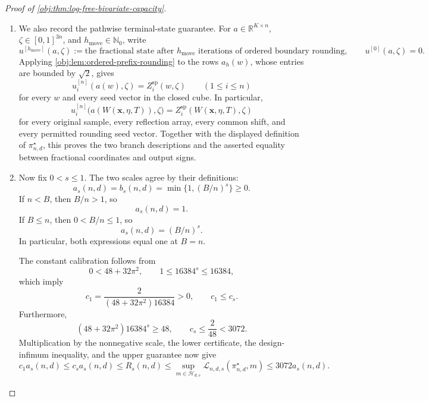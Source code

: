 \begin{proof}[Proof of \cref{obj:thm:log-free-bivariate-capacity}]
\begin{enumerate}
\item
We also record the pathwise terminal-state guarantee. For
\(a\in\mathbb R^{K\times n}\), \(\zeta\in[0,1]^{3n}\), and
\(h_{\mathrm{move}}\in\mathbb N_0\), write
\[
u^{[h_{\mathrm{move}}]}(a,\zeta)
:=
\text{the fractional state after }h_{\mathrm{move}}
\text{ iterations of ordered boundary rounding},
\qquad
u^{[0]}(a,\zeta)=0.
\]
Applying \cref{obj:lem:ordered-prefix-rounding} to the rows
\(a_h(w)\), whose entries are bounded by \(\sqrt2\), gives
\[
u_i^{[n]}(a(w),\zeta)=Z_i^{\mathrm{sp}}(w,\zeta)
\qquad(1\leq i\leq n)
\]
for every \(w\) and every seed vector in the closed cube. In particular,
\[
u_i^{[n]}
\bigl(a(W(\mathbf x,\eta,T)),\zeta\bigr)
=
Z_i^{\mathrm{sp}}(W(\mathbf x,\eta,T),\zeta)
\]
for every original sample, every reflection array, every common shift, and every permitted rounding seed vector. Together with the displayed definition of \(\pi^\star_{n,d}\), this proves the two branch descriptions and the asserted equality between fractional coordinates and output signs.

\item
Now fix \(0<s\leq1\). The two scales agree by their definitions:
\[
a_s(n,d)=b_s(n,d)=\min\{1,(B/n)^s\}\geq0.
\]
If \(n<B\), then \(B/n>1\), so
\[
a_s(n,d)=1.
\]
If \(B\leq n\), then \(0<B/n\leq1\), so
\[
a_s(n,d)=(B/n)^s.
\]
In particular, both expressions equal one at \(B=n\).

The constant calibration follows from
\[
0<48+32\pi^2,
\qquad
1\leq16384^s\leq16384,
\]
which imply
\[
c_1=\frac{2}{(48+32\pi^2)16384}>0,
\qquad
c_1\leq c_s.
\]
Furthermore,
\[
(48+32\pi^2)16384^s\geq48,
\qquad
c_s\leq\frac2{48}<3072.
\]
Multiplication by the nonnegative scale, the lower certificate, the design-infimum inequality, and the upper guarantee now give
\[
c_1a_s(n,d)
\leq c_sa_s(n,d)
\leq R_s(n,d)
\leq
\sup_{m\in\mathcal H_{d,s}}
\mathcal L_{n,d,s}(\pi^\star_{n,d},m)
\leq3072a_s(n,d).
\]


\end{enumerate}
\end{proof}
